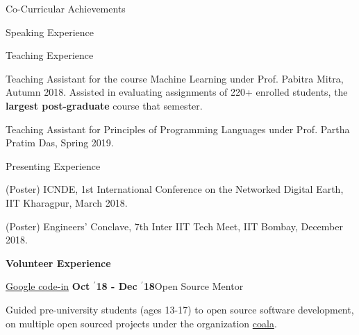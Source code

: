 \documentclass{resume} %
\begin{document}
\begin{rSection}{Co-Curricular Achievements}
\begin{rSubsection}{\large Speaking Experience}{}{}{}
\end{rSubsection}

\vspace{-0.9em}
\begin{rSubsection}{\large Teaching Experience}{}{}{}

\item Teaching Assistant for the course Machine Learning under Prof. Pabitra Mitra, Autumn 2018. Assisted in evaluating assignments of 220+ enrolled students, the \textbf{largest post-graduate} course that semester.
\item Teaching Assistant for Principles of Programming Languages under Prof. Partha Pratim Das, Spring 2019. %

\end{rSubsection}

\vspace{-0.9em}
\begin{rSubsection}{\large Presenting Experience}{}{}{}

\item (Poster) ICNDE, 1st International Conference on the Networked Digital Earth, IIT Kharagpur, March 2018.
\item (Poster) Engineers' Conclave, 7th Inter IIT Tech Meet, IIT Bombay, December 2018.

\end{rSubsection}




\vspace{-0.9em}
{\large {\textbf{Volunteer Experience}}


\vspace{-0.5em}
\begin{rSubsection}{\large \href{https://codein.withgoogle.com/}{Google code-in}}{\textbf{ Oct $^{\prime}$18 - Dec $^{\prime}$18}}{Open Source Mentor}{}
\item Guided pre-university students (ages 13-17) to open source software development, on multiple open sourced projects under the organization \href{http://coala.io}{coala}.
\end{rSubsection}

}
\end{rSection}
\end{document}
